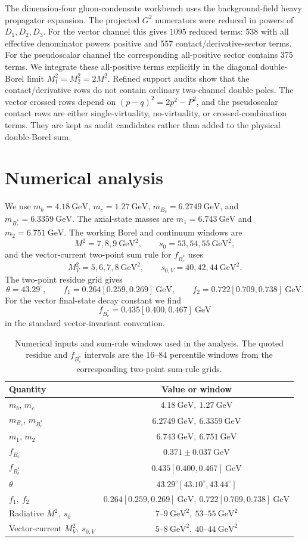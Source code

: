 \documentclass[aps,prd,preprint,nofootinbib,superscriptaddress]{revtex4-2}
\newcommand{\Bc}{B_c}
\newcommand{\Bcst}{B_c^\ast}
\newcommand{\GeV}{\mathrm{GeV}}
\begin{document}
The dimension-four gluon-condensate workbench uses the background-field heavy
propagator expansion.  The projected \(G^2\) numerators were reduced in powers
of \(D_1,D_2,D_3\).  For the vector channel this gives 1095 reduced terms:
538 with all effective denominator powers positive and 557
contact/derivative-sector terms.  For the pseudoscalar channel the
corresponding all-positive sector contains 375 terms.  We integrate these
all-positive terms explicitly in the diagonal double-Borel limit
\(M_1^2=M_2^2=2M^2\).  Refined support audits show that the contact/derivative
rows do not contain ordinary two-channel double poles.  The vector crossed rows
depend on \((p-q)^2=2p^2-P^2\), and the pseudoscalar contact rows are either
single-virtuality, no-virtuality, or crossed-combination terms.  They are kept
as audit candidates rather than added to the physical double-Borel sum.

\section{Numerical analysis}
\label{sec:numerics}

We use \(m_b=4.18~\GeV\), \(m_c=1.27~\GeV\), \(m_{\Bc}=6.2749~\GeV\), and
\(m_{\Bcst}=6.3359~\GeV\).  The axial-state masses are
\(m_1=6.743~\GeV\) and \(m_2=6.751~\GeV\).  The working Borel and continuum
windows are
\[
M^2=7,8,9~\GeV^2,\qquad s_0=53,54,55~\GeV^2,
\]
and the vector-current two-point sum rule for \(f_{\Bcst}\) uses
\[
M_V^2=5,6,7,8~\GeV^2,\qquad s_{0,V}=40,42,44~\GeV^2.
\]
The two-point residue grid gives
\[
\theta=43.29^\circ,\qquad
f_1=0.264[0.259,0.269]~\GeV,\qquad
f_2=0.722[0.709,0.738]~\GeV .
\]
For the vector final-state decay constant we find
\[
f_{\Bcst}=0.435[0.400,0.467]~\GeV
\]
in the standard vector-invariant convention.

\begin{table}[t]
\centering
\caption{Numerical inputs and sum-rule windows used in the analysis.  The
quoted residue and \(f_{\Bcst}\) intervals are the 16--84 percentile windows
from the corresponding two-point sum-rule grids.}
\begin{tabular}{lc}
\toprule
Quantity & Value or window\\
\midrule
\(m_b\), \(m_c\) & \(4.18~\GeV,\ 1.27~\GeV\)\\
\(m_{\Bc}\), \(m_{\Bcst}\) & \(6.2749~\GeV,\ 6.3359~\GeV\)\\
\(m_1\), \(m_2\) & \(6.743~\GeV,\ 6.751~\GeV\)\\
\(f_{\Bc}\) & \(0.371\pm0.037~\GeV\)\\
\(f_{\Bcst}\) & \(0.435[0.400,0.467]~\GeV\)\\
\(\theta\) & \(43.29^\circ[43.10^\circ,43.44^\circ]\)\\
\(f_1,\ f_2\) & \(0.264[0.259,0.269]~\GeV,\ 0.722[0.709,0.738]~\GeV\)\\
Radiative \(M^2,\ s_0\) & \(7\mbox{--}9~\GeV^2,\ 53\mbox{--}55~\GeV^2\)\\
Vector-current \(M_V^2,\ s_{0,V}\) & \(5\mbox{--}8~\GeV^2,\ 40\mbox{--}44~\GeV^2\)\\
\bottomrule
\end{tabular}
\label{tab:inputs}
\end{table}
\end{document}
